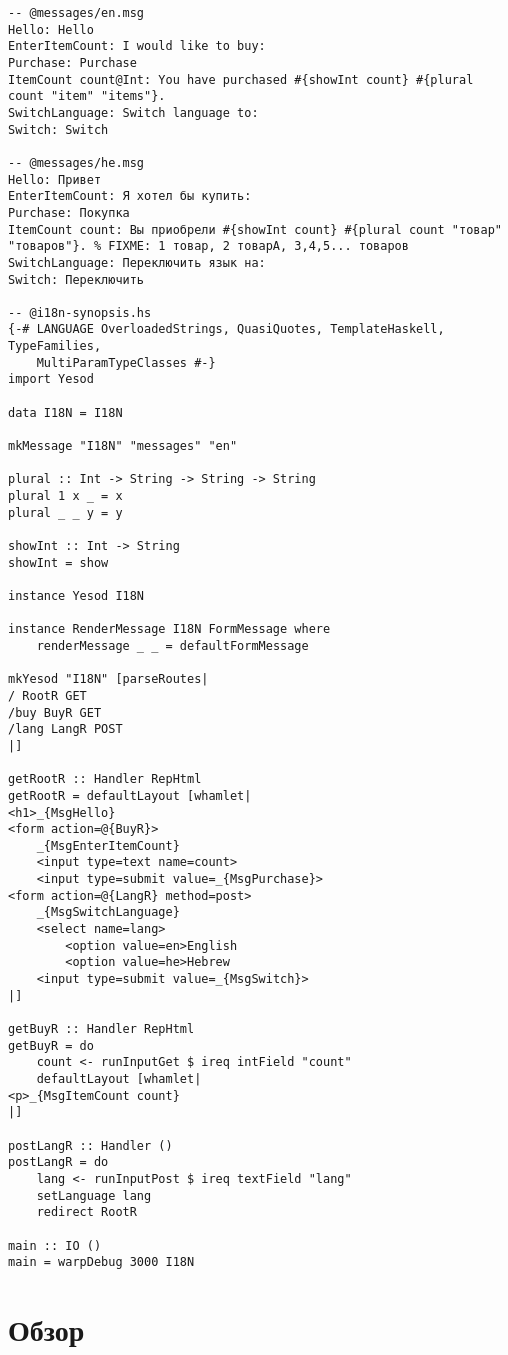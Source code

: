 \begin{lstlisting}
-- @messages/en.msg
Hello: Hello
EnterItemCount: I would like to buy: 
Purchase: Purchase
ItemCount count@Int: You have purchased #{showInt count} #{plural count "item" "items"}.
SwitchLanguage: Switch language to: 
Switch: Switch

-- @messages/he.msg
Hello: Привет
EnterItemCount: Я хотел бы купить: 
Purchase: Покупка
ItemCount count: Вы приобрели #{showInt count} #{plural count "товар" "товаров"}. % FIXME: 1 товар, 2 товарА, 3,4,5... товаров
SwitchLanguage: Переключить язык на:
Switch: Переключить

-- @i18n-synopsis.hs
{-# LANGUAGE OverloadedStrings, QuasiQuotes, TemplateHaskell, TypeFamilies,
    MultiParamTypeClasses #-}
import Yesod

data I18N = I18N

mkMessage "I18N" "messages" "en"

plural :: Int -> String -> String -> String
plural 1 x _ = x
plural _ _ y = y

showInt :: Int -> String
showInt = show

instance Yesod I18N

instance RenderMessage I18N FormMessage where
    renderMessage _ _ = defaultFormMessage

mkYesod "I18N" [parseRoutes|
/ RootR GET
/buy BuyR GET
/lang LangR POST
|]

getRootR :: Handler RepHtml
getRootR = defaultLayout [whamlet|
<h1>_{MsgHello}
<form action=@{BuyR}>
    _{MsgEnterItemCount}
    <input type=text name=count>
    <input type=submit value=_{MsgPurchase}>
<form action=@{LangR} method=post>
    _{MsgSwitchLanguage}
    <select name=lang>
        <option value=en>English
        <option value=he>Hebrew
    <input type=submit value=_{MsgSwitch}>
|]

getBuyR :: Handler RepHtml
getBuyR = do
    count <- runInputGet $ ireq intField "count"
    defaultLayout [whamlet|
<p>_{MsgItemCount count}
|]

postLangR :: Handler ()
postLangR = do
    lang <- runInputPost $ ireq textField "lang"
    setLanguage lang
    redirect RootR

main :: IO ()
main = warpDebug 3000 I18N
\end{lstlisting}

\section{Обзор} %

